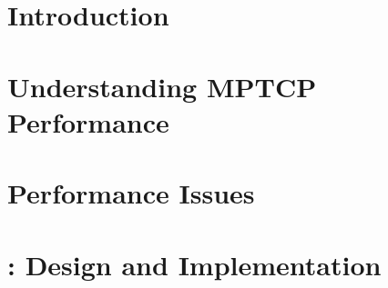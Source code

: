 \graphicspath{{figs/}}

\section{Introduction}


\section{Understanding MPTCP Performance}


\section{Performance Issues}


\section{\name: Design and Implementation}

